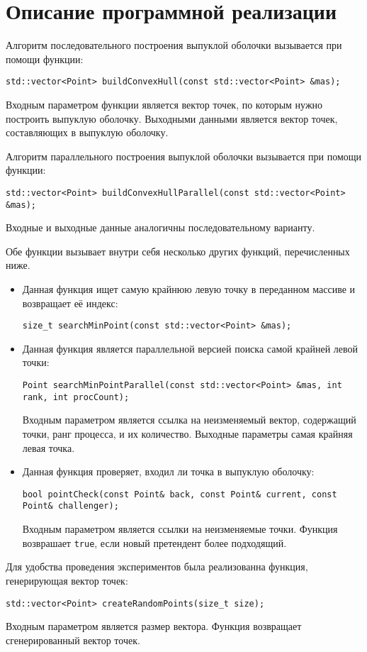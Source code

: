 \documentclass{report}
\begin{document}
\section*{Описание программной реализации}
Алгоритм последовательного построения выпуклой оболочки вызывается при помощи функции:
\begin{lstlisting}
std::vector<Point> buildConvexHull(const std::vector<Point> &mas);
\end{lstlisting}
\par Входным параметром функции является вектор точек, по которым нужно построить выпуклую оболочку. Выходными данными является вектор точек, составляющих в выпуклую оболочку.
\par Алгоритм параллельного построения выпуклой оболочки вызывается при помощи функции:
\begin{lstlisting}
std::vector<Point> buildConvexHullParallel(const std::vector<Point> &mas);
\end{lstlisting}
\par Входные и выходные данные аналогичны последовательному варианту.
\par Обе функции вызывает внутри себя несколько других функций, перечисленных ниже.
\begin{itemize}
\par \item Данная функция ищет самую крайнюю левую точку в переданном массиве и возвращает её индекс:
\begin{lstlisting}
size_t searchMinPoint(const std::vector<Point> &mas);
\end{lstlisting}
\par \item Данная функция является параллельной версией поиска самой крайней левой точки:
\begin{lstlisting}
Point searchMinPointParallel(const std::vector<Point> &mas, int rank, int procCount);
\end{lstlisting}
\par Входным параметром является ссылка на неизменяемый вектор, содержащий точки, ранг процесса, и их количество. Выходные параметры самая крайняя левая точка.
\par \item Данная функция проверяет, входил ли точка в выпуклую оболочку:
\begin{lstlisting}
bool pointCheck(const Point& back, const Point& current, const Point& challenger);
\end{lstlisting}
\par Входным параметром является ссылки на неизменяемые точки. Функция возврашает \verb|true|, если новый претендент более подходящий.
\end{itemize}
\par Для удобства проведения экспериментов была реализованна функция, генерирующая вектор точек:
\begin{lstlisting}
std::vector<Point> createRandomPoints(size_t size);
\end{lstlisting}
\par Входным параметром является размер вектора. Функция возвращает сгенерированный вектор точек.
\newpage
\end{document}
